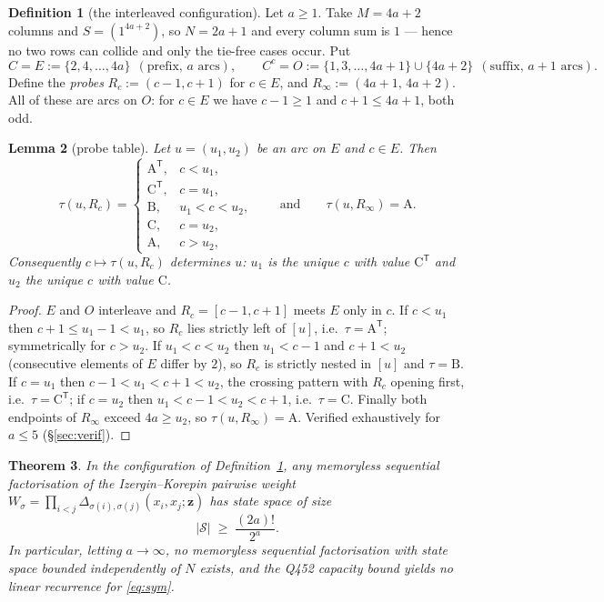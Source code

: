 \documentclass[11pt]{article}
\theoremstyle{plain}
\newtheorem{thm}{Theorem}
\newtheorem{lem}[thm]{Lemma}
\theoremstyle{definition}
\newtheorem{defn}[thm]{Definition}
\newcommand{\Dl}{\Delta}
\newcommand{\bz}{\bm{z}}
\begin{document}
\begin{defn}[the interleaved configuration]\label{def:config}
Let $a\ge1$. Take $M=4a+2$ columns and $S=(1^{4a+2})$, so $N=2a+1$ and every
column sum is $1$ --- hence no two rows can collide and only the tie-free cases
occur. Put
\[
C=E:=\{2,4,\dots,4a\}\ \ (\text{prefix, }a\text{ arcs}),\qquad
C^{c}=O:=\{1,3,\dots,4a+1\}\cup\{4a+2\}\ \ (\text{suffix, }a+1\text{ arcs}).
\]
Define the \emph{probes}
$R_c:=(c-1,c+1)$ for $c\in E$, and $R_\infty:=(4a+1,\,4a+2)$. All of these are
arcs on $O$: for $c\in E$ we have $c-1\ge1$ and $c+1\le4a+1$, both odd.
\end{defn}

\begin{lem}[probe table]\label{lem:probe}
Let $u=(u_1,u_2)$ be an arc on $E$ and $c\in E$. Then
\[
\tau(u,R_c)=
\begin{cases}
\mathrm A^{\mathsf T}, & c<u_1,\\
\mathrm C^{\mathsf T}, & c=u_1,\\
\mathrm B, & u_1<c<u_2,\\
\mathrm C, & c=u_2,\\
\mathrm A, & c>u_2,
\end{cases}
\qquad\text{and}\qquad \tau(u,R_\infty)=\mathrm A .
\]
Consequently $c\mapsto\tau(u,R_c)$ determines $u$: $u_1$ is the unique $c$ with
value $\mathrm C^{\mathsf T}$ and $u_2$ the unique $c$ with value $\mathrm C$.
\end{lem}

\begin{proof}
$E$ and $O$ interleave and $R_c=[c-1,c+1]$ meets $E$ only in $c$. If $c<u_1$
then $c+1\le u_1-1<u_1$, so $R_c$ lies strictly left of $[u]$, i.e.\
$\tau=\mathrm A^{\mathsf T}$; symmetrically for $c>u_2$. If $u_1<c<u_2$ then
$u_1<c-1$ and $c+1<u_2$ (consecutive elements of $E$ differ by $2$), so $R_c$ is
strictly nested in $[u]$ and $\tau=\mathrm B$. If $c=u_1$ then
$c-1<u_1<c+1<u_2$, the crossing pattern with $R_c$ opening first, i.e.\
$\tau=\mathrm C^{\mathsf T}$; if $c=u_2$ then $u_1<c-1<u_2<c+1$, i.e.\
$\tau=\mathrm C$. Finally both endpoints of $R_\infty$ exceed $4a\ge u_2$, so
$\tau(u,R_\infty)=\mathrm A$. Verified exhaustively for $a\le5$
(\S\ref{sec:verif}).
\end{proof}

\begin{thm}\label{thm:main}
In the configuration of Definition~\ref{def:config}, any memoryless sequential
factorisation of the Izergin--Korepin pairwise weight
$W_\sigma=\prod_{i<j}\Dl_{\sigma(i),\sigma(j)}(x_i,x_j;\bz)$ has state space of
size
\[
|\mathcal S|\;\ge\;\frac{(2a)!}{2^{a}} .
\]
In particular, letting $a\to\infty$, no memoryless sequential factorisation with
state space bounded independently of $N$ exists, and the Q452 capacity bound
yields no linear recurrence for \eqref{eq:sym}.
\end{thm}
\end{document}

